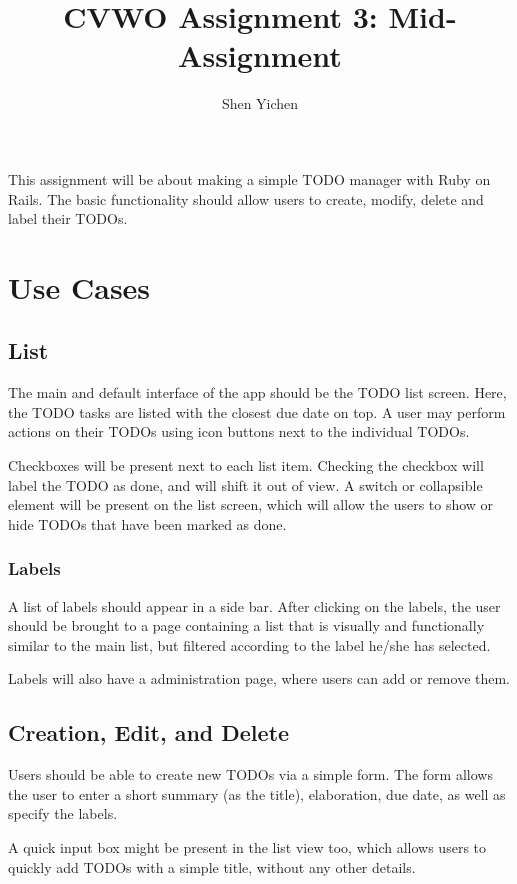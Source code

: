 \documentclass[12pt]{article}
\title{\textsf{\textbf{CVWO Assignment 3: Mid-Assignment}}}
\date{}
\author{\textsf{Shen Yichen}}
\begin{document}
\maketitle

This assignment will be about making a simple TODO manager with Ruby on Rails. The basic functionality should allow users to create, modify, delete and label their TODOs.

\section*{Use Cases}

\subsection*{List}

The main and default interface of the app should be the TODO list screen. Here, the TODO tasks are listed with the closest due date on top. A user may perform actions on their TODOs using icon buttons next to the individual TODOs.

Checkboxes will be present next to each list item. Checking the checkbox will label the TODO as done, and will shift it out of view. A switch or collapsible element will be present on the list screen, which will allow the users to show or hide TODOs that have been marked as done.

\subsubsection*{Labels}

A list of labels should appear in a side bar. After clicking on the labels, the user should be brought to a page containing a list that is visually and functionally similar to the main list, but filtered according to the label he/she has selected.

Labels will also have a administration page, where users can add or remove them.

\subsection*{Creation, Edit, and Delete}

Users should be able to create new TODOs via a simple form. The form allows the user to enter a short summary (as the title), elaboration, due date, as well as specify the labels.

A quick input box might be present in the list view too, which allows users to quickly add TODOs with a simple title, without any other details.
\end{document}
